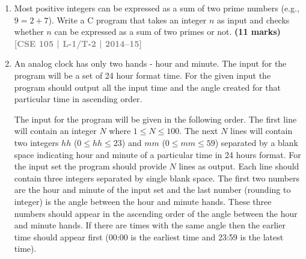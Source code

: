 \documentclass[12pt,a3paper]{article}
\newcommand{\yr}[1]{\hfill\textcolor{gray}{\small\textbf{[#1]}}}
\newcommand{\mk}[1]{\textcolor{orange!70!black}{\small\textbf{(#1 marks)}}}
\begin{document}
\begin{enumerate}
Where, $h$ is the day of week (0: Saturday, 1: Sunday, 2: Monday, 3: Tuesday, 4: Wednesday, 5: Thursday, 6: Friday).

$q$ is the day of the month

$m$ is the month (3: March, 4: April, 12: December). January and February are counted as months 13 and 14 of the previous year.

$y$ is the year.

$\lfloor \quad \rfloor$ is called floor operator. When it is applied to a fractional number $x$ it returns the largest integer not exceeding $x$. For example, $\lfloor 2.3 \rfloor = 2$, $\lfloor 2.7 \rfloor = 2$ and $\lfloor 2.0 \rfloor = 2$

\textbf{NOTE:} In this algorithm January and February are counted as months 13 and 14 of the previous year. E.g. if it is February 2, 2010, the algorithm counts the date as the second day of the fourteenth month of 2009 (02/14/2009 in DD/MM/YYYY format). Write down a program that takes year, month and day of the month as input and prints the day of the week.
\mk{15} \yr{CSE 105 | L-1/T-2 | 2014--15}

\item Most positive integers can be expressed as a sum of two prime numbers (e.g., $9 = 2 + 7$). Write a C program that takes an integer $n$ as input and checks whether $n$ can be expressed as a sum of two primes or not.
\mk{11} \yr{CSE 105 | L-1/T-2 | 2014--15}

\item An analog clock has only two hands - hour and minute. The input for the program will be a set of 24 hour format time. For the given input the program should output all the input time and the angle created for that particular time in ascending order.

\noindent The input for the program will be given in the following order. The first line will contain an integer $N$ where $1 \le N \le 100$. The next $N$ lines will contain two integers $hh$ ($0 \le hh \le 23$) and $mm$ ($0 \le mm \le 59$) separated by a blank space indicating hour and minute of a particular time in 24 hours format. For the input set the program should provide $N$ lines as output. Each line should contain three integers separated by single blank space. The first two numbers are the hour and minute of the input set and the last number (rounding to integer) is the angle between the hour and minute hands. These three numbers should appear in the ascending order of the angle between the hour and minute hands. If there are times with the same angle then the earlier time should appear first (00:00 is the earliest time and 23:59 is the latest time).


\end{enumerate}
\end{document}
